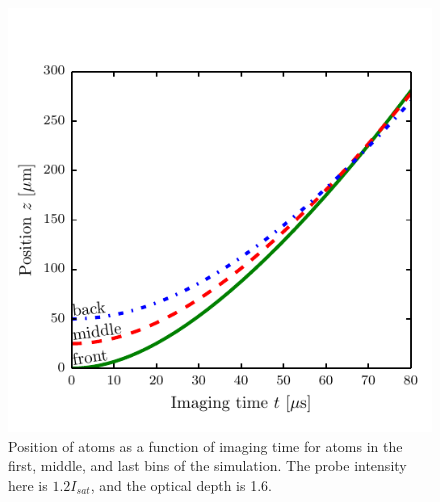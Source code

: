 \documentclass[12pt]{iopart}
\begin{document}
\begin{figure}
	\includegraphics[scale=0.57]{figure4}
\caption{Position of atoms as a function of imaging time for atoms in the first, middle, and last bins of the simulation. The probe intensity here is $1.2 I_{sat}$, and the optical depth is 1.6.}  
\label{fig:atomTravel}
\end{figure}
\end{document}
